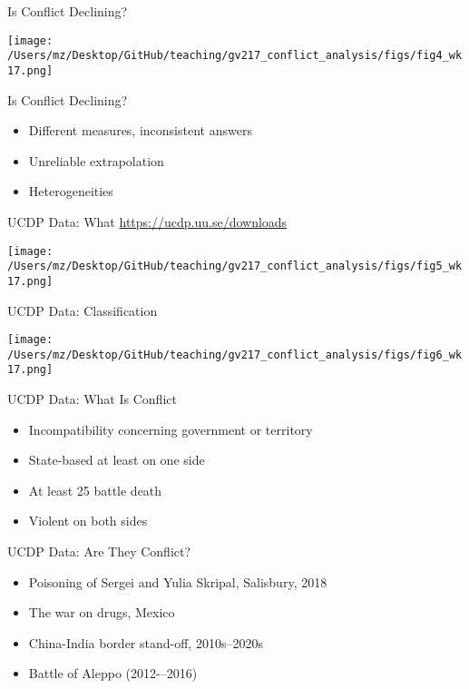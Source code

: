 \documentclass{beamer}
\begin{document}
\begin{frame}{Is Conflict Declining?}
    \pause
    \begin{center}
        \texttt{[image: /Users/mz/Desktop/GitHub/teaching/gv217\_conflict\_analysis/figs/fig4\_wk17.png]}
    \end{center}
\end{frame}

\begin{frame}{Is Conflict Declining?}
    \begin{itemize}
        \item Different measures, inconsistent answers
        \item Unreliable extrapolation
        \pause\item Heterogeneities
    \end{itemize}
\end{frame}

\begin{frame}{UCDP Data: What}
    \pause\url{https://ucdp.uu.se/downloads}
    \pause
    \begin{center}
        \texttt{[image: /Users/mz/Desktop/GitHub/teaching/gv217\_conflict\_analysis/figs/fig5\_wk17.png]}
    \end{center}
\end{frame}

\begin{frame}{UCDP Data: Classification}
    \pause
    \begin{center}
        \texttt{[image: /Users/mz/Desktop/GitHub/teaching/gv217\_conflict\_analysis/figs/fig6\_wk17.png]}
    \end{center}
\end{frame}

\begin{frame}{UCDP Data: What Is Conflict}
    \begin{itemize}
        \pause\item Incompatibility concerning government or territory
        \pause\item State-based at least on one side
        \pause\item At least 25 battle death
        \pause\item Violent on both sides
    \end{itemize}
\end{frame}

\begin{frame}{UCDP Data: Are They Conflict?}
    \begin{itemize}
        \pause\item Poisoning of Sergei and Yulia Skripal, Salisbury, 2018
        \pause\item The war on drugs, Mexico
        \pause\item China-India border stand-off, 2010s--2020s
        \pause\item Battle of Aleppo (2012-–2016)
    \end{itemize}
\end{frame}
\end{document}
